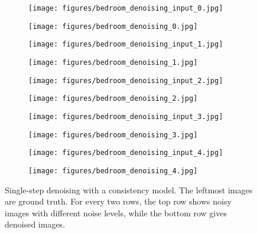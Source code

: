 \begin{appendices}
\begin{figure}
    \centering
    \begin{subfigure}[b]{0.11\textwidth}
        \texttt{[image: figures/bedroom\_denoising\_input\_0.jpg]}
    \end{subfigure}\hfill
    \begin{subfigure}[b]{0.88\textwidth}
        \texttt{[image: figures/bedroom\_denoising\_0.jpg]}
    \end{subfigure}
    \begin{subfigure}[b]{0.11\textwidth}
        \texttt{[image: figures/bedroom\_denoising\_input\_1.jpg]}
    \end{subfigure}\hfill
    \begin{subfigure}[b]{0.88\textwidth}
        \texttt{[image: figures/bedroom\_denoising\_1.jpg]}
    \end{subfigure}
    \begin{subfigure}[b]{0.11\textwidth}
        \texttt{[image: figures/bedroom\_denoising\_input\_2.jpg]}
    \end{subfigure}\hfill
    \begin{subfigure}[b]{0.88\textwidth}
        \texttt{[image: figures/bedroom\_denoising\_2.jpg]}
    \end{subfigure}
    \begin{subfigure}[b]{0.11\textwidth}
        \texttt{[image: figures/bedroom\_denoising\_input\_3.jpg]}
    \end{subfigure}\hfill
    \begin{subfigure}[b]{0.88\textwidth}
        \texttt{[image: figures/bedroom\_denoising\_3.jpg]}
    \end{subfigure}
    \begin{subfigure}[b]{0.11\textwidth}
        \texttt{[image: figures/bedroom\_denoising\_input\_4.jpg]}
    \end{subfigure}\hfill
    \begin{subfigure}[b]{0.88\textwidth}
        \texttt{[image: figures/bedroom\_denoising\_4.jpg]}
    \end{subfigure}
    \caption{Single-step denoising with a consistency model. The leftmost images are ground truth. For every two rows, the top row shows noisy images with different noise levels, while the bottom row gives denoised images.}
    \label{fig:bedroom_denoising}
\end{figure}



\end{appendices}

